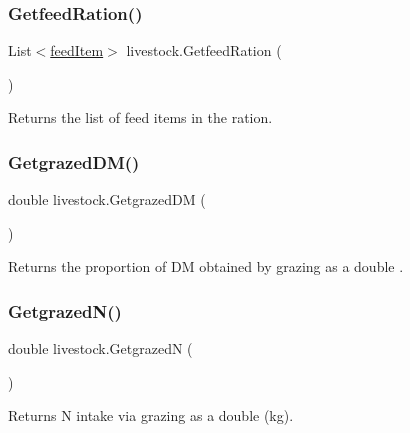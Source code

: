 \subsubsection{\texorpdfstring{GetfeedRation()}{GetfeedRation()}}
{\footnotesize\ttfamily List$<$\mbox{\hyperlink{classfeed_item}{feed\+Item}}$>$ livestock.\+Getfeed\+Ration (\begin{DoxyParamCaption}{ }\end{DoxyParamCaption})\hspace{0.3cm}{\ttfamily [inline]}}



Returns the list of feed items in the ration. 

\mbox{\label{classlivestock_a1bd87a98d88bb40dca656880ea0e17e0}} 
\subsubsection{\texorpdfstring{GetgrazedDM()}{GetgrazedDM()}}
{\footnotesize\ttfamily double livestock.\+Getgrazed\+DM (\begin{DoxyParamCaption}{ }\end{DoxyParamCaption})\hspace{0.3cm}{\ttfamily [inline]}}



Returns the proportion of DM obtained by grazing as a double . 

\mbox{\label{classlivestock_a528e48c445b8b6473e8ac4d72d9a498e}} 
\subsubsection{\texorpdfstring{GetgrazedN()}{GetgrazedN()}}
{\footnotesize\ttfamily double livestock.\+GetgrazedN (\begin{DoxyParamCaption}{ }\end{DoxyParamCaption})\hspace{0.3cm}{\ttfamily [inline]}}



Returns N intake via grazing as a double (kg). 

\mbox{\label{classlivestock_a97877b7ae61e64a6f2d38d4f23fcec6f}} 
